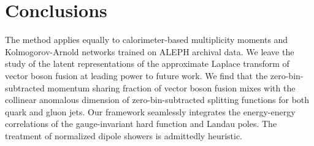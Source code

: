 \section{Conclusions}\label{sec:conclusions}

The method applies equally to calorimeter-based multiplicity moments and
Kolmogorov-Arnold networks trained on ALEPH archival data. We leave the
study of the latent representations of the approximate Laplace transform
of vector boson fusion at leading power to future work. We find that the
zero-bin-subtracted momentum sharing fraction of vector boson fusion
mixes with the collinear anomalous dimension of zero-bin-subtracted
splitting functions for both quark and gluon jets. Our framework
seamlessly integrates the energy-energy correlations of the
gauge-invariant hard function and Landau poles. The treatment of
normalized dipole showers is admittedly heuristic.

